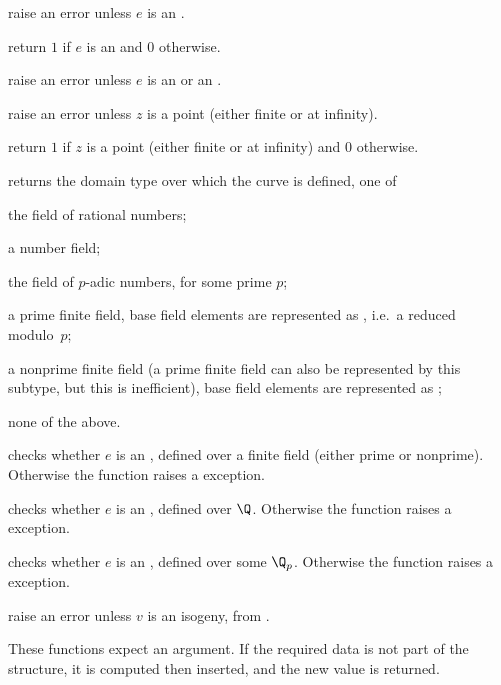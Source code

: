 
 raise an error unless $e$ is an .

 return $1$ if $e$ is an  and $0$
otherwise.

 raise an error unless $e$ is an 
or an .

 raise an error unless $z$ is a point
(either finite or at infinity).

 return $1$ if $z$ is a point
(either finite or at infinity) and $0$ otherwise.

 returns the domain type over which the curve
is defined, one of

   the field of rational numbers;

   a number field;

   the field of $p$-adic numbers, for some prime $p$;

   a prime finite field, base field elements are represented as
  , i.e.~a  reduced modulo~$p$;

   a nonprime finite field (a prime finite field can also be
  represented by this subtype, but this is inefficient), base field elements
  are represented as ;

   none of the above.

 checks whether $e$ is an , defined
over a finite field (either prime or nonprime). Otherwise the function
raises a  exception.

 checks whether $e$ is an , defined
over $\Q$. Otherwise the function raises a  exception.

 checks whether $e$ is an , defined
over some $\Q_p$. Otherwise the function raises a 
exception.

 raise an error unless $v$ is an isogeny,
from .


These functions expect an  argument. If the required data is not
part of the structure, it is computed then inserted, and the new value is
returned.

